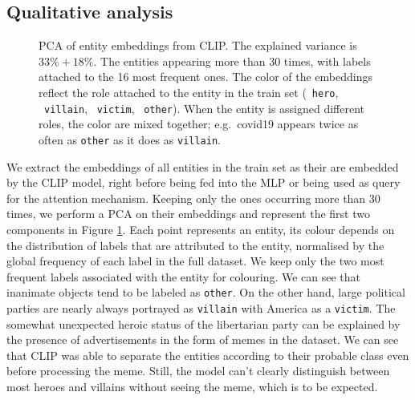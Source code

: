 \subsection{Qualitative analysis}
\begin{figure}
	\centering
	\caption{%
	    PCA of entity embeddings from CLIP.
	    The explained variance is $33\%+18\%$.
	    The entities appearing more than 30 times, with labels attached to the 16 most frequent ones.
	    The color of the embeddings reflect the role attached to the entity in the train set (~\texttt{hero}, ~\texttt{villain}, ~\texttt{victim}, ~\texttt{other}).
	    When the entity is assigned different roles, the color are mixed together; e.g.\ covid19  appears twice as often as \texttt{other} as it does as \texttt{villain}.
	}
	\label{fig:entities_pca}
\end{figure}

We extract the embeddings of all entities in the train set as their are embedded by the CLIP model, right before being fed into the MLP or being used as query for the attention mechanism. Keeping only the ones occurring more than 30 times, we perform a PCA on their embeddings and represent the first two components in Figure \ref{fig:entities_pca}.
Each point represents an entity, its colour depends on the distribution of labels that are attributed to the entity, normalised by the global frequency of each label in the full dataset. We keep only the two most frequent labels associated with the entity for colouring.
We can see that inanimate objects tend to be labeled as \texttt{other}.
On the other hand, large political parties are nearly always portrayed as \texttt{villain} with America as a \texttt{victim}.
The somewhat unexpected heroic status of the libertarian party can be explained by the presence of advertisements in the form of memes in the dataset.
We can see that CLIP was able to separate the entities according to their probable class even before processing the meme.
Still, the model can't clearly distinguish between most heroes and villains without seeing the meme, which is to be expected.

